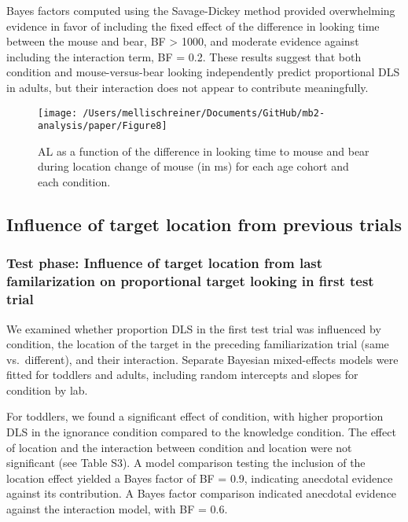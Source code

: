 \documentclass[
  man, donotrepeattitle,floatsintext]{apa6}
\begin{document}
Bayes factors computed using the Savage-Dickey method provided overwhelming evidence in favor of including the fixed effect of the difference in looking time between the mouse and bear, BF \textgreater{} 1000, and moderate evidence against including the interaction term, BF = 0.2. These results suggest that both condition and mouse-versus-bear looking independently predict proportional DLS in adults, but their interaction does not appear to contribute meaningfully.

\begin{figure}

{\centering \texttt{[image: /Users/mellischreiner/Documents/GitHub/mb2-analysis/paper/Figure8]} 

}

\caption{AL as a function of the difference in looking time to mouse and bear during location change of mouse (in ms) for each age cohort and each condition.}\label{fig:fig10}
\end{figure}

\subsection{Influence of target location from previous trials}\label{influence-of-target-location-from-previous-trials}

\subsubsection{Test phase: Influence of target location from last familarization on proportional target looking in first test trial}\label{test-phase-influence-of-target-location-from-last-familarization-on-proportional-target-looking-in-first-test-trial}

We examined whether proportion DLS in the first test trial was influenced by condition, the location of the target in the preceding familiarization trial (same vs.~different), and their interaction. Separate Bayesian mixed-effects models were fitted for toddlers and adults, including random intercepts and slopes for condition by lab.

For toddlers, we found a significant effect of condition, with higher proportion DLS in the ignorance condition compared to the knowledge condition. The effect of location and the interaction between condition and location were not significant (see Table S3). A model comparison testing the inclusion of the location effect yielded a Bayes factor of BF = 0.9, indicating anecdotal evidence against its contribution. A Bayes factor comparison indicated anecdotal evidence against the interaction model, with
BF = 0.6.
\end{document}
